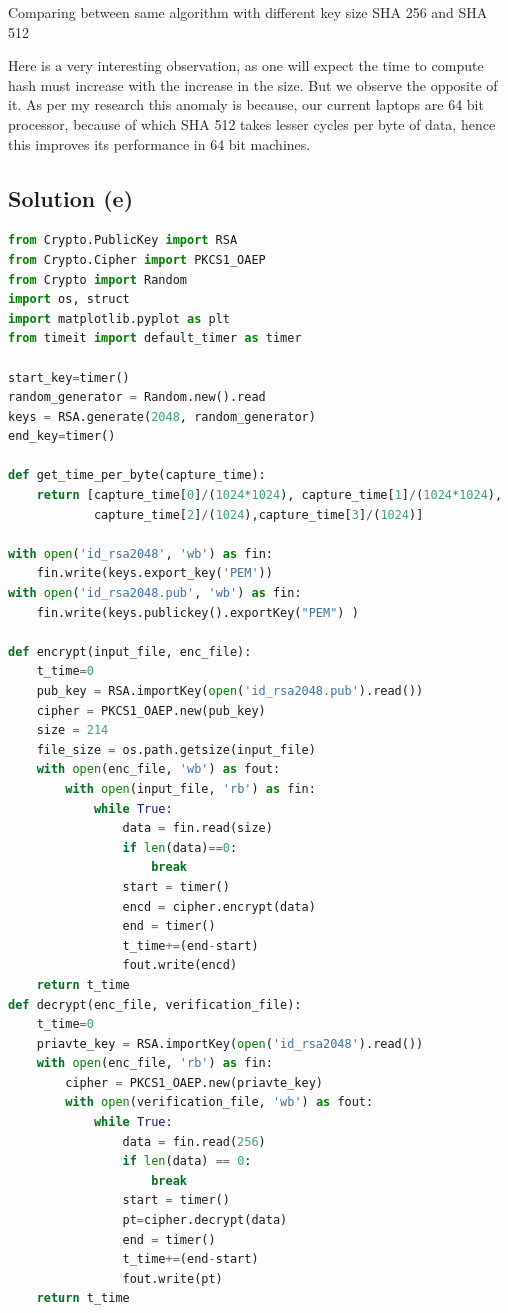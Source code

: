 \documentclass[12pt]{article}%
\begin{document}
Comparing between same algorithm with different key size SHA 256 and SHA 512

Here is a very interesting observation, as one will expect the time to compute hash must increase with the increase in the size. But we observe the opposite of it. As per my research this anomaly is because, our current laptops are 64 bit processor, because of which SHA 512 takes lesser cycles per byte of data, hence this improves its performance in 64 bit machines.

\subsection{Solution (e)}
\begin{lstlisting}[language=Python]
from Crypto.PublicKey import RSA
from Crypto.Cipher import PKCS1_OAEP
from Crypto import Random
import os, struct
import matplotlib.pyplot as plt
from timeit import default_timer as timer

start_key=timer()
random_generator = Random.new().read
keys = RSA.generate(2048, random_generator)
end_key=timer()

def get_time_per_byte(capture_time):
    return [capture_time[0]/(1024*1024), capture_time[1]/(1024*1024),
            capture_time[2]/(1024),capture_time[3]/(1024)]

with open('id_rsa2048', 'wb') as fin:
    fin.write(keys.export_key('PEM'))
with open('id_rsa2048.pub', 'wb') as fin:
    fin.write(keys.publickey().exportKey("PEM") )

def encrypt(input_file, enc_file):
    t_time=0
    pub_key = RSA.importKey(open('id_rsa2048.pub').read())
    cipher = PKCS1_OAEP.new(pub_key)
    size = 214
    file_size = os.path.getsize(input_file)
    with open(enc_file, 'wb') as fout:
        with open(input_file, 'rb') as fin:
            while True:
                data = fin.read(size)
                if len(data)==0:
                    break
                start = timer()
                encd = cipher.encrypt(data)
                end = timer()
                t_time+=(end-start)
                fout.write(encd)
    return t_time
def decrypt(enc_file, verification_file):
    t_time=0
    priavte_key = RSA.importKey(open('id_rsa2048').read())
    with open(enc_file, 'rb') as fin:
        cipher = PKCS1_OAEP.new(priavte_key)
        with open(verification_file, 'wb') as fout:
            while True:
                data = fin.read(256)
                if len(data) == 0:
                    break
                start = timer()
                pt=cipher.decrypt(data)
                end = timer()
                t_time+=(end-start)
                fout.write(pt)
    return t_time


\end{lstlisting}
\end{document}
